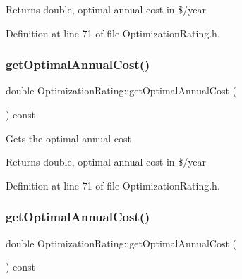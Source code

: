 \begin{DoxyReturn}{Returns}
double, optimal annual cost in \$/year 
\end{DoxyReturn}


Definition at line 71 of file Optimization\+Rating.\+h.

\mbox{\label{class_optimization_rating_ada9718f5369be2b14b4b0c07d4fa9510}} 
\subsubsection{\texorpdfstring{get\+Optimal\+Annual\+Cost()}{getOptimalAnnualCost()}\hspace{0.1cm}{\footnotesize\ttfamily [2/3]}}
{\footnotesize\ttfamily double Optimization\+Rating\+::get\+Optimal\+Annual\+Cost (\begin{DoxyParamCaption}{ }\end{DoxyParamCaption}) const\hspace{0.3cm}{\ttfamily [inline]}}

Gets the optimal annual cost

\begin{DoxyReturn}{Returns}
double, optimal annual cost in \$/year 
\end{DoxyReturn}


Definition at line 71 of file Optimization\+Rating.\+h.

\mbox{\label{class_optimization_rating_ada9718f5369be2b14b4b0c07d4fa9510}} 
\subsubsection{\texorpdfstring{get\+Optimal\+Annual\+Cost()}{getOptimalAnnualCost()}\hspace{0.1cm}{\footnotesize\ttfamily [3/3]}}
{\footnotesize\ttfamily double Optimization\+Rating\+::get\+Optimal\+Annual\+Cost (\begin{DoxyParamCaption}{ }\end{DoxyParamCaption}) const\hspace{0.3cm}{\ttfamily [inline]}}

